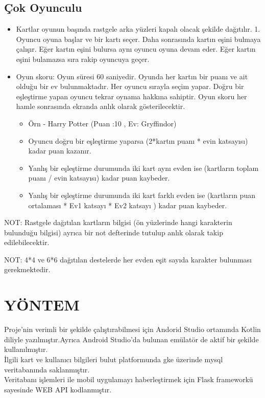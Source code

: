 \documentclass[conference]{IEEEtran}
\begin{document}
\subsection{Çok Oyunculu}
\begin{itemize}
    \item Kartlar oyunun başında rastgele arka yüzleri kapalı olacak şekilde dağıtılır. 1. Oyuncu oyuna başlar ve bir kartı seçer. Daha sonrasında kartın eşini bulmaya çalışır. Eğer kartın eşini bulursa aynı oyuncu oyuna devam eder. Eğer kartın eşini bulamazsa sıra rakip oyuncuya geçer.

    \item Oyun skoru: Oyun süresi 60 saniyedir. Oyunda her kartın bir puanı ve ait olduğu bir ev bulunmaktadır. Her oyuncu sırayla seçim yapar. Doğru bir eşleştirme yapan oyuncu tekrar oynama hakkına sahiptir. Oyun skoru her hamle sonrasında ekranda anlık olarak gösterilecektir.

    \begin{itemize}
        \item Örn - Harry Potter (Puan :10 , Ev: Gryffindor)
        \item Oyuncu doğru bir eşleştirme yaparsa (2*kartın puanı * evin katsayısı) kadar puan kazanır.
        \item Yanlış bir eşleştirme durumunda iki kart aynı evden ise (kartların toplam puanı / evin katsayısı) kadar puan kaybeder.
        \item Yanlış bir eşleştirme durumunda iki kart farklı evden ise (kartların puan ortalaması * Ev1 katsayı * Ev2 katsayı ) kadar puan kaybeder.
    \end{itemize}

    
\end{itemize}

NOT: Rastgele dağıtılan kartların bilgisi (ön yüzlerinde hangi karakterin bulunduğu bilgisi) ayrıca bir not defterinde tutulup anlık olarak takip edilebilecektir.

NOT: 4*4 ve 6*6 dağıtılan destelerde her evden eşit sayıda karakter bulunması gerekmektedir.

\section{YÖNTEM}

Proje'nin verimli bir şekilde çalıştırabilmesi için Andorid Studio ortamında Kotlin diliyle yazılmıştır.Ayrıca Android Studio'da bulunan emülatör de aktif bir şekilde kullanılmıştır.\\
İlgili kart ve kullanıcı bilgileri bulut platformunda gke üzerinde mysql veritabanında saklanmıştır.\\
Veritabanı işlemleri ile mobil uygulamayı haberleştirmek için Flask frameworkü sayesinde WEB API kodlanmıştır.\\
\end{document}
